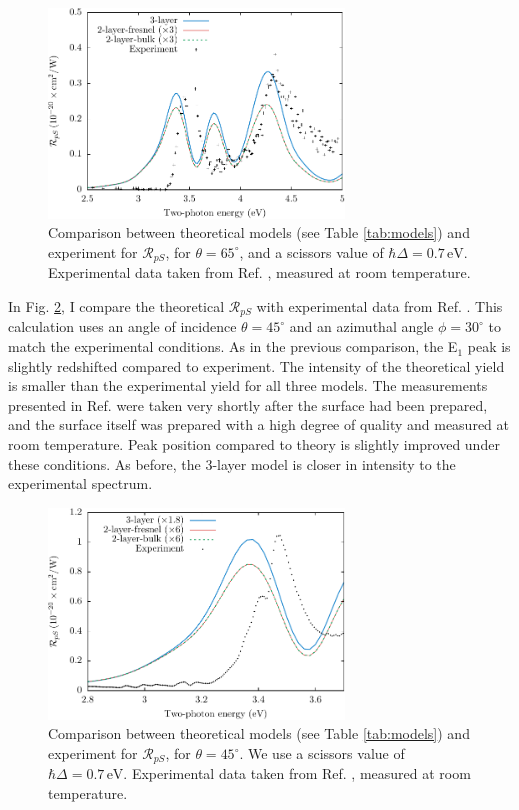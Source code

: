 \begin{figure}[H]
\centering
\includegraphics[width=0.7\textwidth]{content/figures/fig-Si1x1-Mejia_RpS}
\caption{Comparison between theoretical models (see Table \ref{tab:models}) and
experiment for $\mathcal{R}_{pS}$, for $\theta=65^{\circ}$, and a scissors value
of $\hbar\Delta = 0.7\,\text{eV}$. Experimental data taken from Ref.
\cite{mejiaPRB02}, measured at room temperature.}
\label{fig:RpS}
\end{figure}

In Fig. \ref{fig:mitchellRpS}, I compare the theoretical $\mathcal{R}_{pS}$ with
experimental data from Ref. \cite{mitchellSS01}. This calculation uses an angle
of incidence $\theta=45^\circ$ and an azimuthal angle $\phi=30^\circ$ to match
the experimental conditions. As in the previous comparison, the E$_{1}$ peak is
slightly redshifted compared to experiment. The intensity of the theoretical
yield is smaller than the experimental yield for all three models. The
measurements presented in Ref. \cite{mitchellSS01} were taken very shortly after
the surface had been prepared, and the surface itself was prepared with a high
degree of quality and measured at room temperature. Peak position compared to
theory is slightly improved under these conditions. As before, the 3-layer model
is closer in intensity to the experimental spectrum.

\begin{figure}[H]
\centering
\includegraphics[width=0.7\textwidth]{content/figures/fig-Si1x1-Mitchell_RpS}
\caption{Comparison between theoretical models (see Table \ref{tab:models}) and
experiment for $\mathcal{R}_{pS}$, for $\theta=45^\circ$. We use a scissors
value of $\hbar\Delta = 0.7\,\text{eV}$. Experimental data taken from Ref.
\cite{mitchellSS01}, measured at room temperature.}
\label{fig:mitchellRpS}
\end{figure}

